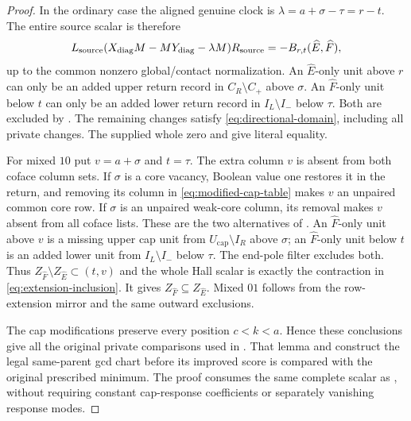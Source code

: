 \documentclass[11pt,a4paper]{amsart}
\numberwithin{equation}{section}
\theoremstyle{plain}
\theoremstyle{definition}
\begin{document}
\begin{proof}
In the ordinary case the aligned genuine clock is
\(\lambda=a+\sigma-\tau=r-t\).  The entire source scalar is therefore
\[
 L_{\rm source}(X_{\rm diag}M-MY_{\rm diag}-\lambda M)R_{\rm source}
       =-B_{r,t}(\widehat E,\widehat F),
\]
up to the common nonzero global/contact normalization.  An
\(\widehat E\)-only unit above \(r\) can only be an added upper return record
in \(C_R\setminus C_+\) above \(\sigma\).  An \(\widehat F\)-only unit below
\(t\) can only be an added lower return record in \(I_L\setminus I_-\) below
\(\tau\).  Both are excluded by .  The remaining
changes satisfy \eqref{eq:directional-domain}, including all private
changes.  The supplied whole zero and
 give literal equality.

For mixed \(10\) put \(v=a+\sigma\) and \(t=\tau\).  The extra column \(v\) is
absent from both coface column sets.  If \(\sigma\) is a core vacancy,
Boolean value one restores it in the return, and removing its column in
\eqref{eq:modified-cap-table} makes \(v\) an unpaired common core row.
If \(\sigma\) is an unpaired weak-core column, its removal makes \(v\)
absent from all coface lists.  These are the two alternatives of
.  An \(\widehat F\)-only unit above \(v\) is a
missing upper cap unit from \(U_{\mathrm{cap}}\setminus I_R\) above \(\sigma\); an
\(\widehat F\)-only unit below \(t\) is an added lower unit from
\(I_L\setminus I_-\) below \(\tau\).  The end-pole filter excludes both.
Thus \(Z_{\widehat F}\setminus Z_{\widehat E}\subset(t,v)\) and the whole
Hall scalar is exactly the contraction in
\eqref{eq:extension-inclusion}.  It gives
\(Z_{\widehat F}\subseteq Z_{\widehat E}\).  Mixed \(01\) follows from the
row-extension mirror and the same outward exclusions.

The cap modifications preserve every position \(c<k<a\).  Hence these
conclusions give all the original private comparisons used in
.  That lemma and  construct the legal
same-parent gcd chart before its improved score is compared with the
original prescribed minimum.  The proof consumes the same complete
scalar as , without requiring constant cap-response
coefficients or separately vanishing response modes.
\end{proof}
\end{document}
